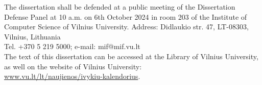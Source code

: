 \begin{singlespace}
\vspace{2cm}

\noindent
The dissertation shall be defended at a public meeting of the Dissertation Defense Panel at 10 a.m. on 6th October 2024 in room 203 of the Institute of Computer Science of Vilnius University. Address: Didlaukio str. 47, LT-08303, Vilnius, Lithuania\\ 
Tel. +370 5 219 5000; e-mail: mif@mif.vu.lt \\

\vspace{1cm}
\noindent
The text of this dissertation can be accessed at the Library of Vilnius
University, as well on the website of Vilnius University:\\ 
\href{ www.vu.lt/lt/naujienos/ivykiu-kalendorius}{ www.vu.lt/lt/naujienos/ivykiu-kalendorius}.

\if{} \thesisTitleEN \else \thesisTitleLT \fi

\end{singlespace}

